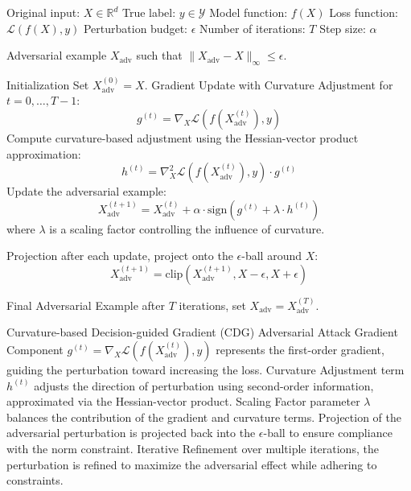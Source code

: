Original input: $X \in \mathbb{R}^d$
True label: $y \in \mathcal{Y}$
Model function: $f(X)$
Loss function: $\mathcal{L}(f(X), y)$
Perturbation budget: $\epsilon$
Number of iterations: $T$
Step size: $\alpha$

Adversarial example $X_{\text{adv}}$ such that $\|X_{\text{adv}} - X\|_\infty \leq \epsilon$.

Initialization Set $X^{(0)}_{\text{adv}} = X$.
Gradient Update with Curvature Adjustment for $t = 0, \dots, T-1$:
    \[
    g^{(t)} = \nabla_X \mathcal{L}(f(X^{(t)}_{\text{adv}}), y)
    \]
    Compute curvature-based adjustment using the Hessian-vector product approximation:
    \[
    h^{(t)} = \nabla^2_X \mathcal{L}(f(X^{(t)}_{\text{adv}}), y) \cdot g^{(t)}
    \]
    Update the adversarial example:
    \[
    X^{(t+1)}_{\text{adv}} = X^{(t)}_{\text{adv}} + \alpha \cdot \text{sign}(g^{(t)} + \lambda \cdot h^{(t)})
    \]
    where $\lambda$ is a scaling factor controlling the influence of curvature.

Projection after each update, project onto the $\epsilon$-ball around $X$:
    \[
    X^{(t+1)}_{\text{adv}} = \text{clip}(X^{(t+1)}_{\text{adv}}, X - \epsilon, X + \epsilon)
    \]

Final Adversarial Example after $T$ iterations, set $X_{\text{adv}} = X^{(T)}_{\text{adv}}$.

Curvature-based Decision-guided Gradient (CDG) Adversarial Attack Gradient Component $g^{(t)} = \nabla_X \mathcal{L}(f(X^{(t)}_{\text{adv}}), y)$ represents the first-order gradient, guiding the perturbation toward increasing the loss. Curvature Adjustment term $h^{(t)}$ adjusts the direction of perturbation using second-order information, approximated via the Hessian-vector product. Scaling Factor parameter $\lambda$ balances the contribution of the gradient and curvature terms. Projection of the adversarial perturbation is projected back into the $\epsilon$-ball to ensure compliance with the norm constraint. Iterative Refinement over multiple iterations, the perturbation is refined to maximize the adversarial effect while adhering to constraints.

